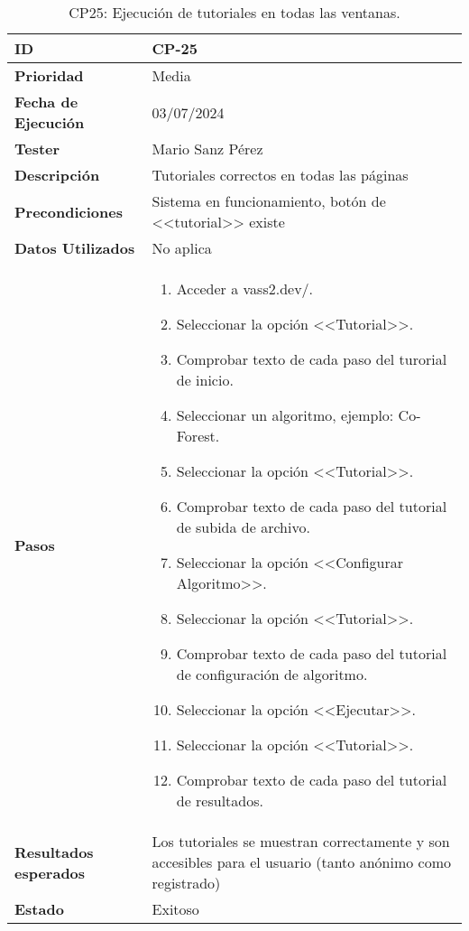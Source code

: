 \begin{table}[ht]
	\centering
	\renewcommand{\arraystretch}{1.5} %
	\begin{tabular}{>{\raggedright\arraybackslash}p{4cm} p{9.5cm}}
    \hline
    \rowcolor{gray!20}
    \textbf{ID} & CP-25\\
    \hline
    \rowcolor{white}
    \textbf{Prioridad} & Media \\
    \hline
    \rowcolor{gray!20}
    \textbf{Fecha de Ejecución} & 03/07/2024 \\
    \hline
    \rowcolor{white}
    \textbf{Tester} & Mario Sanz Pérez \\
    \hline
    \rowcolor{gray!20}
    \textbf{Descripción} & Tutoriales correctos en todas las páginas\\
    \hline
    \rowcolor{white}
    \textbf{Precondiciones} & Sistema en funcionamiento, botón de <<tutorial>> existe\\
    \hline
    \rowcolor{white}
    \textbf{Datos Utilizados} & No aplica\\
    \hline
    \rowcolor{gray!20}
    \textbf{Pasos} & \begin{enumerate}
        \item Acceder a vass2.dev/.
        \item Seleccionar la opción <<Tutorial>>.
        \item Comprobar texto de cada paso del turorial de inicio.
        \item Seleccionar un algoritmo, ejemplo: Co-Forest.
        \item Seleccionar la opción <<Tutorial>>.
        \item Comprobar texto de cada paso del tutorial de subida de archivo.
        \item Seleccionar la opción <<Configurar Algoritmo>>.
        \item Seleccionar la opción <<Tutorial>>.
        \item Comprobar texto de cada paso del tutorial de configuración de algoritmo.
        \item Seleccionar la opción <<Ejecutar>>.
        \item Seleccionar la opción <<Tutorial>>.
        \item Comprobar texto de cada paso del tutorial de resultados.
    \end{enumerate}\\
	\hline
    \rowcolor{gray!20}
    \textbf{Resultados esperados} & Los tutoriales se muestran correctamente y son accesibles para el usuario (tanto anónimo como registrado)\\
    \hline
    \rowcolor{white}
    \textbf{Estado} & Exitoso\\
    \hline
\end{tabular}
	\caption[CP25: Ejecución de tutoriales]{CP25: Ejecución de tutoriales en todas las ventanas.}
\end{table}

